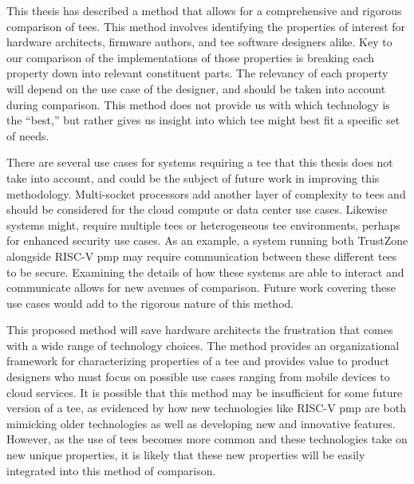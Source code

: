 This thesis has described a method that allows for a comprehensive and rigorous comparison of \glspl{tee}. This method involves identifying the properties of interest for hardware architects, firmware authors, and \gls{tee} software designers alike. Key to our comparison of the implementations of those properties is breaking each property down into relevant constituent parts. The relevancy of each property will depend on the use case of the designer, and should be taken into account during comparison. This method does not provide us with which technology is the ``best,'' but rather gives us insight into which \gls{tee} might best fit a specific set of needs.

There are several use cases for systems requiring a \gls{tee} that this thesis does not take into account, and could be the subject of future work in improving this methodology. Multi-socket processors \cite{knauth2018integrating} add another layer of complexity to \glspl{tee} and should be considered for the cloud compute or data center use cases. Likewise systems might, require multiple \glspl{tee} or heterogeneous \gls{tee} environments, perhaps for enhanced security use cases. As an example, a system running both TrustZone alongside RISC-V \gls{pmp} may require communication between these different \glspl{tee} to be secure. Examining the details of how these systems are able to interact and communicate allows for new avenues of comparison. Future work covering these use cases would add to the rigorous nature of this method. 

This proposed method will save hardware architects the frustration that comes with a wide range of technology choices. The method provides an organizational framework for characterizing properties of a \gls{tee} and provides value to product designers who must focus on possible use cases ranging from mobile devices to cloud services. It is possible that this method may be insufficient for some future version of a \gls{tee}, as evidenced by how new technologies like RISC-V \gls{pmp} are both mimicking older technologies as well as developing new and innovative features. However, as the use of \glspl{tee} becomes more common and these technologies take on new unique properties, it is likely that these new properties will be easily integrated into this method of comparison.